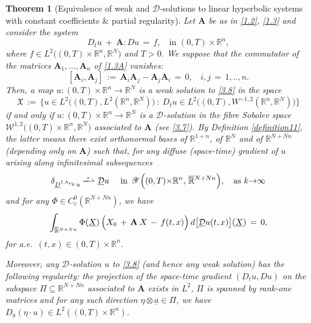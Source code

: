 \documentclass{amsart}
\newtheorem{theorem}{Theorem}
\theoremstyle{definition}
\numberwithin{equation}{section}
\begin{document}
\begin{theorem}[Equivalence of weak and ${\mathcal{D}}$-solutions to linear hyperbolic systems with constant coefficients \& partial regularity] \label{theorem10} Let ${\textbf{A}}$ be as in \eqref{1.2}, \eqref{1.3} and consider the system
\begin{equation} \label{3.8}
D_tu\ +\ {\textbf{A}} {\!:\!} Du\, =\, f, \, \ \ \text{ in }(0,T){\times} {\mathbb{R}}^n,
\end{equation}
where $f\in L^2\big(  (0,T){\times} {\mathbb{R}}^n,{\mathbb{R}}^N\big)$ and $T>0$. We suppose that the commutator of the matrices ${\textbf{A}}_1,...,{\textbf{A}}_n$ of \eqref{1.3A} vanishes:
\[
[{\textbf{A}}_i,{\textbf{A}}_j]\, :=\, {\textbf{A}}_i {\textbf{A}}_j - {\textbf{A}}_j{\textbf{A}}_i\, =\, 0, \ \ \ \ i,j\,=\,1,..,n.
\]
Then, a map $u : (0,T){\times} {\mathbb{R}}^n {\longrightarrow} {\mathbb{R}}^N$ is a weak solution to \eqref{3.8} in the space
\begin{equation} \label{3.9}
\mathfrak{X}\, :=\, \Big\{u \in L^2\big((0,T),L^2({\mathbb{R}}^n,{\mathbb{R}}^N) \big)\ : \  D_t u \in L^2\big((0,T),W^{-1,2}({\mathbb{R}}^n,{\mathbb{R}}^N) \big)\Big\}
\end{equation}
if and only if $u : (0,T){\times} {\mathbb{R}}^n {\longrightarrow} {\mathbb{R}}^N$ is a ${\mathcal{D}}$-solution in the fibre Sobolev space $\mathscr{W}^{1,2}\big((0,T){\times} {\mathbb{R}}^n,{\mathbb{R}}^N\big)$ associated to ${\textbf{A}}$ (see \eqref{3.7}). By Definition \ref{definition11}, the latter means there exist orthonormal bases of ${\mathbb{R}}^{1+n}$, of ${\mathbb{R}}^N$ and of ${\mathbb{R}}^{N+Nn}$ (depending only on ${\textbf{A}}$) such that,  for any diffuse (space-time) gradient of $u$ arising along infinitesimal subsequences
\[
{\delta}_{{\underline{D}}^{1,h_{\nu_k}}u} \, \overset{^*}{\smash{-\!\!\!\!-\!\!\!\!\rightharpoonup}}\,\, \underline{\mathcal{D}} u\ \ \ \text{ in }\, {\mathscr{Y}}\Big((0,T){\times} {\mathbb{R}}^n, \, \smash{\overline{\mathbb{R}}}^{N+Nn}\Big), \ \ \text{ as }k {\rightarrow} \infty
\]
and for any $\Phi \in C^0_c({\mathbb{R}}^{N+Nn})$, we have
\[
\int_{ \smash{\overline{\mathbb{R}}}^{N+Nn} } \Phi(\underline{X})\, \Big(X_0\, +\, {\textbf{A}}\:X\, -\, f(t,x) \Big)\,d\big[  \underline{\mathcal{D}} u(t,x) \big](\underline{X})\,=\,0, 
\]
for a.e.\ $(t,x)\in (0,T){\times} {\mathbb{R}}^n$. 

Moreover, any ${\mathcal{D}}$-solution $u$ to \eqref{3.8} (and hence any weak solution) has the following regularity: the projection of the space-time gradient $(D_t u,Du)$ on the subspace $\Pi {\subseteq} {\mathbb{R}}^{N+Nn}$ associated to ${\textbf{A}}$ exists in $L^2$, $\Pi$ is spanned by rank-one matrices and for any such direction $\eta {\otimes} \underline{a}\in \Pi$, we have $D_{\underline{a}} (\eta \cdot u) \in L^2((0,T)\!{\times} \!{\mathbb{R}}^n)$.
\end{theorem}
\end{document}
